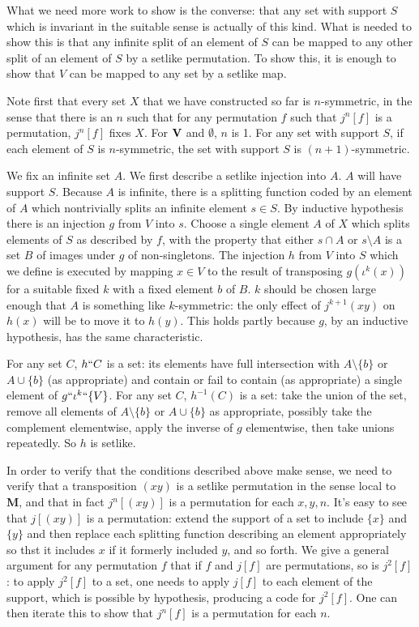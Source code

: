 \documentclass{article}
\begin{document}
\begin{description}
What we need more work to show is the converse:  that any set with support $S$ which is invariant in the suitable sense is actually of this kind.  What is needed to show this is that any infinite split
of an element of $S$ can be mapped to any other split of an element of $S$ by a setlike permutation.  To show this, it is enough to show that $V$ can be mapped to any set by a setlike map.


Note first that every set $X$  that we have constructed so far is $n$-symmetric, in the sense that there is an $n$ such that for any permutation $f$ such that $j^n[f]$ is a permutation, $j^n[f]$ fixes
$X$.  For ${\bf V}$ and $\emptyset$, $n$ is 1.  For any set with support $S$, if each element of $S$ is $n$-symmetric, the set with support $S$ is $(n+1)$-symmetric.


We fix an infinite set $A$.  We first describe a setlike injection into $A$.  $A$ will have support $S$.  Because $A$ is infinite, there is a splitting function coded by an element of $A$ which nontrivially splits
an infinite element $s \in S$.  By inductive hypothesis there is an injection $g$ from $V$ into $s$.  Choose a single element $A$ of $X$ which splits elements of $S$ as described by $f$, with the property
that either $s \cap A$ or $s \setminus A$ is a set $B$ of images under $g$ of non-singletons.  The injection $h$ from $V$ into $S$ which we define is executed by mapping $x \in V$ to the
result of transposing $g(\iota^k(x))$ for a suitable fixed $k$ with a fixed element $b$ of $B$.  $k$ should be chosen large enough that $A$ is something like $k$-symmetric:  the only effect
of $j^{k+1}(xy)$ on $h(x)$ will be to move it to $h(y)$.  This holds partly because $g$, by an inductive hypothesis, has the same characteristic.

For any set $C$, $h``C$ is a set:  its elements have full intersection with $A \setminus \{b\}$ or $A \cup \{b\}$ (as appropriate) and contain or fail to contain (as appropriate) a single element of $g``\iota^k``\{V\}$.  For any set $C$, $h^{-1}(C)$ is a set:  take the union of the set, remove all elements of $A \setminus \{b\}$ or $A \cup \{b\}$ as appropriate, possibly take the complement elementwise,
apply the inverse of $g$ elementwise, then take unions repeatedly.  So $h$ is setlike.

In order to verify that the conditions described above make sense, we need to verify that a transposition $(xy)$ is a setlike permutation in the sense local to {\bf M}, and that in fact $j^n[(xy)]$ is a permutation for 
each $x,y,n$.  It's easy to see that $j[(xy)]$ is a permutation:  extend the support of a set to include $\{x\}$ and $\{y\}$ and then replace each splitting function describing an element appropriately
so thst it includes $x$ if it formerly included $y$, and so forth.  We give a general argument for any permutation $f$ that if $f$ and $j[f]$ are permutations, so is $j^2[f]$:
to apply $j^2[f]$ to a set, one needs to apply $j[f]$ to each element of the support, which is possible by hypothesis, producing a code for $j^2[f]$.  One can then iterate this to show
that $j^n[f]$ is a permutation for each $n$.


\end{description}
\end{document}
